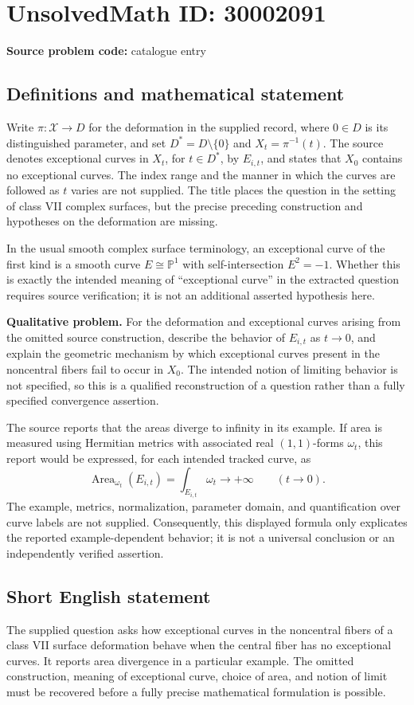 \documentclass[11pt]{article}
\begin{document}
\section*{UnsolvedMath ID: 30002091}
\textbf{Source problem code:} catalogue entry
\subsection{Definitions and mathematical statement}
Write \(\pi:\mathcal X\to D\) for the deformation in the supplied record, where \(0\in D\) is its distinguished parameter, and set \(D^*=D\setminus\{0\}\) and \(X_t=\pi^{-1}(t)\). The source denotes exceptional curves in \(X_t\), for \(t\in D^*\), by \(E_{i,t}\), and states that \(X_0\) contains no exceptional curves. The index range and the manner in which the curves are followed as \(t\) varies are not supplied. The title places the question in the setting of class VII complex surfaces, but the precise preceding construction and hypotheses on the deformation are missing.

In the usual smooth complex surface terminology, an exceptional curve of the first kind is a smooth curve \(E\cong\mathbb P^1\) with self-intersection \(E^2=-1\). Whether this is exactly the intended meaning of ``exceptional curve'' in the extracted question requires source verification; it is not an additional asserted hypothesis here.

\textbf{Qualitative problem.} For the deformation and exceptional curves arising from the omitted source construction, describe the behavior of \(E_{i,t}\) as \(t\to0\), and explain the geometric mechanism by which exceptional curves present in the noncentral fibers fail to occur in \(X_0\). The intended notion of limiting behavior is not specified, so this is a qualified reconstruction of a question rather than a fully specified convergence assertion.

The source reports that the areas diverge to infinity in its example. If area is measured using Hermitian metrics with associated real \((1,1)\)-forms \(\omega_t\), this report would be expressed, for each intended tracked curve, as
\[
\operatorname{Area}_{\omega_t}(E_{i,t})=\int_{E_{i,t}}\omega_t\longrightarrow+\infty\qquad(t\to0).
\]
The example, metrics, normalization, parameter domain, and quantification over curve labels are not supplied. Consequently, this displayed formula only explicates the reported example-dependent behavior; it is not a universal conclusion or an independently verified assertion.
\subsection{Short English statement}
The supplied question asks how exceptional curves in the noncentral fibers of a class VII surface deformation behave when the central fiber has no exceptional curves. It reports area divergence in a particular example. The omitted construction, meaning of exceptional curve, choice of area, and notion of limit must be recovered before a fully precise mathematical formulation is possible.
\end{document}
